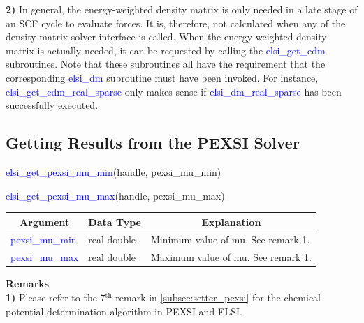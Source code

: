 \documentclass{report}
\begin{document}
\textbf{2)} In general, the energy-weighted density matrix is only needed in a late stage of an SCF cycle to evaluate forces.  It is, therefore, not calculated when any of the density matrix solver interface is called.  When the energy-weighted density matrix is actually needed, it can be requested by calling the \textcolor{blue}{elsi\_get\_edm} subroutines.  Note that these subroutines all have the requirement that the corresponding \textcolor{blue}{elsi\_dm} subroutine must have been invoked.  For instance, \textcolor{blue}{elsi\_get\_edm\_real\_sparse} only makes sense if \textcolor{blue}{elsi\_dm\_real\_sparse} has been successfully executed.\\

\subsection{Getting Results from the PEXSI Solver}
\label{subsec:getter_pexsi}
\begin{labeling}{\hspace{6cm}}
\item [\hspace{0.3cm} \textcolor{blue}{elsi\_get\_pexsi\_mu\_min}(handle, pexsi\_mu\_min)]
\item [\hspace{0.3cm} \textcolor{blue}{elsi\_get\_pexsi\_mu\_max}(handle, pexsi\_mu\_max)]
\end{labeling}

\begin{tabular}[]{|p{30mm}|p{45mm}|p{90mm}|}
\hline
\multicolumn{1}{|c|}{\textbf{Argument}} & \multicolumn{1}{c|}{\textbf{Data Type}} & \multicolumn{1}{c|}{\textbf{Explanation}}\\
\hline
\textcolor{blue}{pexsi\_mu\_min} & real double & Minimum value of mu.  See remark 1.\\
\hline
\textcolor{blue}{pexsi\_mu\_max} & real double & Maximum value of mu.  See remark 1.\\
\hline
\end{tabular}

\bigskip
\textbf{Remarks}\\

\textbf{1)} Please refer to the 7$^\text{th}$ remark in \ref{subsec:setter_pexsi} for the chemical potential determination algorithm in PEXSI and ELSI.\\
\end{document}
